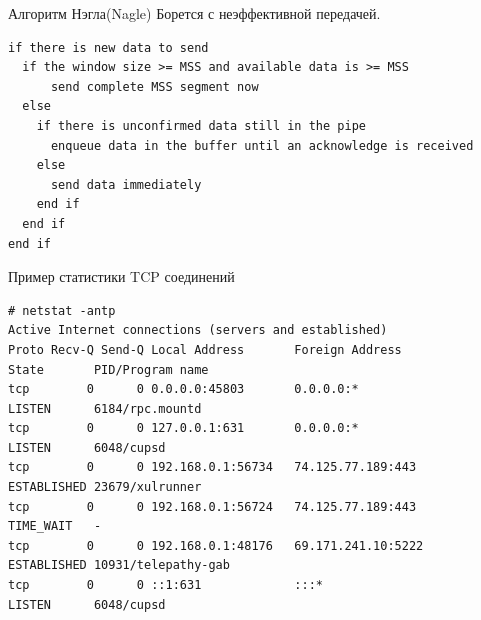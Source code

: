 \begin{frame}[fragile]{Алгоритм Нэгла(Nagle)}
Борется с неэффективной передачей.
\begin{verbatim}
if there is new data to send
  if the window size >= MSS and available data is >= MSS
      send complete MSS segment now
  else
    if there is unconfirmed data still in the pipe
      enqueue data in the buffer until an acknowledge is received
    else
      send data immediately
    end if
  end if
end if
\end{verbatim}
\end{frame}



\begin{frame}

\end{frame}


\begin{frame}

\end{frame}


\begin{frame}

\end{frame}


\begin{frame}

\end{frame}


\begin{frame}[fragile]{Пример статистики TCP соединений}
	\tiny
	\begin{verbatim}
# netstat -antp
Active Internet connections (servers and established)
Proto Recv-Q Send-Q Local Address       Foreign Address             State       PID/Program name   
tcp        0      0 0.0.0.0:45803       0.0.0.0:*                   LISTEN      6184/rpc.mountd     
tcp        0      0 127.0.0.1:631       0.0.0.0:*                   LISTEN      6048/cupsd          
tcp        0      0 192.168.0.1:56734   74.125.77.189:443           ESTABLISHED 23679/xulrunner     
tcp        0      0 192.168.0.1:56724   74.125.77.189:443           TIME_WAIT   -                   
tcp        0      0 192.168.0.1:48176   69.171.241.10:5222          ESTABLISHED 10931/telepathy-gab 
tcp        0      0 ::1:631             :::*                        LISTEN      6048/cupsd          
	\end{verbatim}
	\normalsize
\end{frame}

